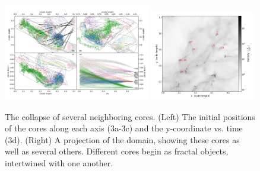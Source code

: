 
\begin{figure} \begin{center}
\includegraphics[width=0.57\textwidth]{figs/overlap_hair_u603_S01.pdf}
\includegraphics[width=0.41\textwidth]{figs/u503_c0052_n0106__Projection_z_density.png}
\caption[ ]{The collapse of several neighboring cores.  (Left) The initial
positions of the cores along each axis (3a-3c) and the y-coordinate vs. time
(3d).  (Right) A projection of the domain, showing these cores as well as
several others. Different cores begin as fractal objects, intertwined with one
another.}
\label{fig.cores} \end{center} \end{figure}
